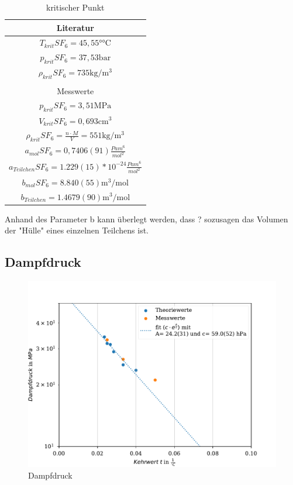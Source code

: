 \documentclass[11pt, a4paper]{article}
\begin{document}
    \begin{table}
        \centering
        \begin{tabular}{c}
            Literatur \\ \hline
            $T_{krit} SF_6 = 45,55 \si{\degree \celsius}$ \cite{SH6} \\
            $p_{krit} SF_6 = 37,53 \si{\bar}$ \cite{SH6} \\
            $\rho_{krit} SF_6 = 735 \si{\kilogram \per \meter \cubed}$ \cite{SH6} \\
            \\
            Messwerte \\ \hline
            $p_{krit} SF_6 = 3,51 \si{\mega\pascal}$ \\
            $V_{krit} SF_6 = 0,693 \si{\centi\metre\cubed}$ \\
            $\rho_{krit} SF_6 = \frac{n \cdot M}{V} = 551 \si{\kilogram \per \meter \cubed}$ \\
            $a_{mol} SF_6 = 0,7406(91) \frac{Pa m^6}{mol^2}$ \\
            $a_{Teilchen} SF_6 = 1.229(15)*10^{-24} \frac{Pa m^6}{mol^2}$ \\
            $b_{mol} SF_6 = 8.840(55)\si{\cubic\metre\per\mol}$\\
            $b_{Teilchen} = 1.4679(90)\si{\cubic\metre\per\mol}$
        \end{tabular}
        \caption{kritischer Punkt}
        \label{tab:krit}
    \end{table}
    Anhand des Parameter b kann überlegt werden, dass ? sozusagen das Volumen der "Hülle" eines einzelnen Teilchens ist.
    \subsection{Dampfdruck}
    \begin{figure}
        \centering
        \includegraphics[width=\textwidth]{./Plots/dampf.pdf}

        \caption{Dampfdruck}
        \label{fig:dampf}
    \end{figure}
\end{document}
